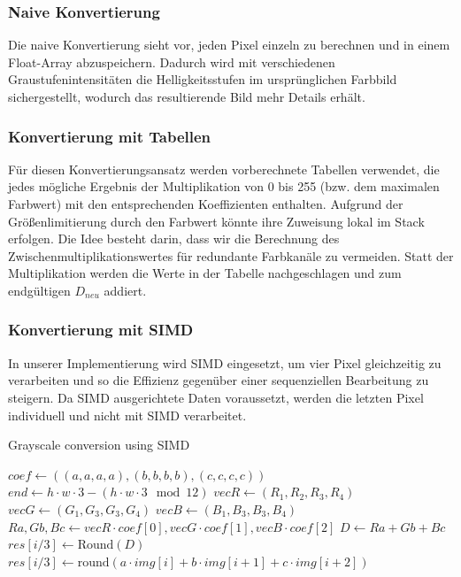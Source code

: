 \documentclass[course=erap]{aspdoc}
\begin{document}
\subsubsection{Naive Konvertierung}
Die naive Konvertierung sieht vor, jeden Pixel einzeln zu berechnen und in einem Float-Array abzuspeichern. Dadurch wird mit verschiedenen Graustufenintensitäten die Helligkeitsstufen im ursprünglichen Farbbild sichergestellt, wodurch das resultierende Bild mehr Details erhält.

\subsubsection{Konvertierung mit Tabellen}
Für diesen Konvertierungsansatz werden vorberechnete Tabellen verwendet, die jedes mögliche Ergebnis der Multiplikation von 0 bis 255 (bzw. dem maximalen Farbwert) mit den entsprechenden Koeffizienten enthalten. Aufgrund der Größenlimitierung durch den Farbwert könnte ihre Zuweisung lokal im Stack erfolgen. Die Idee besteht darin, dass wir die Berechnung des Zwischenmultiplikationswertes für redundante Farbkanäle zu vermeiden. Statt der Multiplikation werden die Werte in der Tabelle nachgeschlagen und zum endgültigen $D_{neu}$ addiert.

\subsubsection{Konvertierung mit SIMD}
In unserer Implementierung wird SIMD  eingesetzt, um vier Pixel gleichzeitig zu verarbeiten und so die Effizienz gegenüber einer sequenziellen Bearbeitung zu steigern. Da SIMD ausgerichtete Daten voraussetzt, werden die letzten Pixel individuell und nicht mit SIMD verarbeitet.\\

\begin{algorithm}
\caption{Grayscale conversion using SIMD}
\small %
\begin{algorithmic}[1]
    \State $coef \gets ((a, a, a, a), (b, b, b, b), (c, c, c, c))$ 
    \State $end \gets h \cdot w \cdot 3 - (h \cdot w \cdot 3 \mod 12)$
     
        \State $vecR \gets (R_{1}, R_{2}, R_{3}, R_{4})$
        \State $vecG \gets (G_{1}, G_{3}, G_{3}, G_{4})$
        \State $vecB \gets (B_{1}, B_{3}, B_{3}, B_{4})$
        \State $Ra, Gb, Bc \gets vecR \cdot coef[0], vecG \cdot coef[1], vecB \cdot coef[2]$
        \State $D \gets Ra + Gb + Bc$ 
        \State $res[i/3] \gets \text{Round}(D)$ 
    \EndFor
     
        \State $res[i/3] \gets \text{round}(a \cdot img[i] + b \cdot img[i+1] + c \cdot img[i+2])$
    \EndFor
\end{algorithmic}
\end{algorithm}
\end{document}
